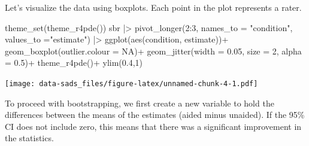 \documentclass[
  letterpaper,
]{book}
\newenvironment{Shaded}{\begin{snugshade}}{\end{snugshade}}
\newcommand{\AttributeTok}[1]{\textcolor[rgb]{0.40,0.45,0.13}{#1}}
\newcommand{\CommentTok}[1]{\textcolor[rgb]{0.37,0.37,0.37}{#1}}
\newcommand{\ConstantTok}[1]{\textcolor[rgb]{0.56,0.35,0.01}{#1}}
\newcommand{\DecValTok}[1]{\textcolor[rgb]{0.68,0.00,0.00}{#1}}
\newcommand{\FloatTok}[1]{\textcolor[rgb]{0.68,0.00,0.00}{#1}}
\newcommand{\FunctionTok}[1]{\textcolor[rgb]{0.28,0.35,0.67}{#1}}
\newcommand{\NormalTok}[1]{\textcolor[rgb]{0.00,0.23,0.31}{#1}}
\newcommand{\OtherTok}[1]{\textcolor[rgb]{0.00,0.23,0.31}{#1}}
\newcommand{\SpecialCharTok}[1]{\textcolor[rgb]{0.37,0.37,0.37}{#1}}
\newcommand{\StringTok}[1]{\textcolor[rgb]{0.13,0.47,0.30}{#1}}
\begin{document}
Let's visualize the data using boxplots. Each point in the plot
represents a rater.

\begin{Shaded}
\begin{Highlighting}[]
\FunctionTok{theme\_set}\NormalTok{(}\FunctionTok{theme\_r4pde}\NormalTok{())}
\NormalTok{sbr }\SpecialCharTok{|\textgreater{}} 
  \FunctionTok{pivot\_longer}\NormalTok{(}\DecValTok{2}\SpecialCharTok{:}\DecValTok{3}\NormalTok{, }\AttributeTok{names\_to =} \StringTok{"condition"}\NormalTok{, }\AttributeTok{values\_to =}\StringTok{"estimate"}\NormalTok{) }\SpecialCharTok{|\textgreater{}} 
  \FunctionTok{ggplot}\NormalTok{(}\FunctionTok{aes}\NormalTok{(condition, estimate))}\SpecialCharTok{+}
  \FunctionTok{geom\_boxplot}\NormalTok{(}\AttributeTok{outlier.colour =} \ConstantTok{NA}\NormalTok{)}\SpecialCharTok{+}
  \FunctionTok{geom\_jitter}\NormalTok{(}\AttributeTok{width =} \FloatTok{0.05}\NormalTok{, }\AttributeTok{size =} \DecValTok{2}\NormalTok{, }\AttributeTok{alpha =} \FloatTok{0.5}\NormalTok{)}\SpecialCharTok{+}
  \FunctionTok{theme\_r4pde}\NormalTok{()}\SpecialCharTok{+}
  \FunctionTok{ylim}\NormalTok{(}\FloatTok{0.4}\NormalTok{,}\DecValTok{1}\NormalTok{)}
\end{Highlighting}
\end{Shaded}

\texttt{[image: data-sads\_files/figure-latex/unnamed-chunk-4-1.pdf]}

To proceed with bootstrapping, we first create a new variable to hold
the differences between the means of the estimates (aided minus
unaided). If the 95\% CI does not include zero, this means that there
was a significant improvement in the statistics.

\begin{Shaded}
\end{Shaded}
\end{document}
